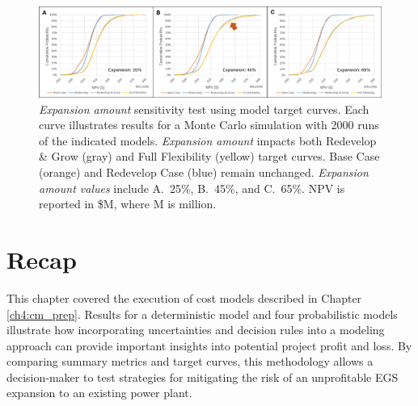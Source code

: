 \begin{figure}[!htp]
\centering
\includegraphics[width=.98\textwidth]{templates/images/Figure-Sensitivity_Expansion_Amount.png}
\caption[Expansion Amount sensitivity test]{\textit{Expansion amount} sensitivity test using model target curves. Each curve illustrates results for a Monte Carlo simulation with 2000 runs of the indicated models. \textit{Expansion amount} impacts both Redevelop \& Grow (gray) and Full Flexibility (yellow) target curves. Base Case (orange) and Redevelop Case (blue) remain unchanged. \textit{Expansion amount values} include A.\ 25\%, B.\ 45\%, and C.\ 65\%. NPV is reported in \$M, where M is million.}
\label{fig:sens_test_expansion}
\end{figure}

\section{Recap}\label{ch6:recap}

This chapter covered the execution of cost models described in Chapter \ref{ch4:cm_prep}. Results for a deterministic model and four probabilistic models illustrate how incorporating uncertainties and decision rules into a modeling approach can provide important insights into potential project profit and loss. By comparing summary metrics and target curves, this methodology allows a decision-maker to test strategies for mitigating the risk of an unprofitable EGS expansion to an existing power plant.

